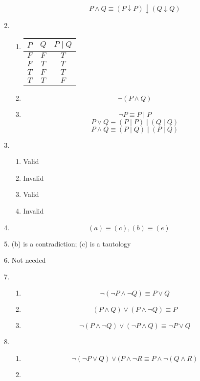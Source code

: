 \begin{enumerate}
\begin{enumerate}
        \[P \land Q \equiv (P \downarrow P) \downarrow (Q \downarrow Q)\]
    \end{enumerate}
    \item 
    \begin{enumerate}
        \item
        \begin{tabular}{c | c | c}
            $P$ & $Q$ & $P \mid Q$\\
            \hline
            $F$ & $F$ & $T$ \\
            $F$ & $T$ & $T$ \\
            $T$ & $F$ & $T$ \\
            $T$ & $T$ & $F$
        \end{tabular}
        \item
        \[\lnot(P \land Q)\]
        \item 
        \[\lnot P \equiv P \mid P\]
        \[P \lor Q \equiv (P \mid P) \mid (Q \mid Q)\]
        \[P \land Q \equiv (P \mid Q) \mid (P \mid Q)\]
    \end{enumerate}
    \item
    \begin{enumerate}
        \item Valid
        \item Invalid
        \item Valid
        \item Invalid
    \end{enumerate}
    \item 
    \[(a) \equiv (c), (b) \equiv (e)\]
    \item
    (b) is a contradiction; (c) is a tautology
    \item
    Not needed
    \item 
    \begin{enumerate}
        \item 
        \[\lnot (\lnot P \land \lnot Q) \equiv P \lor Q\]
        \item 
        \[(P \land Q) \lor (P \land \lnot Q) \equiv P\]
        \item 
        \[\lnot (P \land \lnot Q) \lor (\lnot P \land Q) \equiv \lnot P \lor Q\]
    \end{enumerate}
    \item 
    \begin{enumerate}
        \item 
        \[\lnot (\lnot P \lor Q) \lor (P \land \lnot R \equiv P \land \lnot (Q \land R)\]
        \item 

\end{enumerate}
\end{enumerate}
